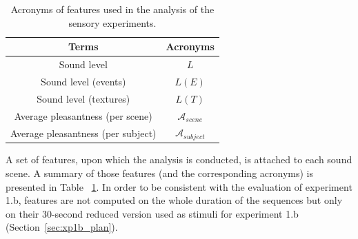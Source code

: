 \documentclass[12pt]{elsarticle}
\newcommand{\cf}{cf.}
\begin{document}
\begin{table}[t]
\centering
\begin{tabular}{c c}
Terms                              & Acronyms                   \\
\hline
Sound level                        & $L$                        \\
Sound level (events)               & $L(E)$                     \\
Sound level (textures)             & $L(T)$                     \\
Average pleasantness (per scene)   & $\mathcal{A}_{scene}$      \\
Average pleasantness (per subject) & $\mathcal{A}_{subject}$      \\
\hline
\end{tabular}
\vspace{0.5mm}
\caption{Acronyms of features used in the analysis of the sensory experiments.}
\label{tab:acronyme}
\end{table}


A set of features, upon which the analysis is conducted, is attached to each sound scene. A summary of those features (and the corresponding acronyms) is presented in Table ~\ref{tab:acronyme}. In order to be consistent with the evaluation of experiment 1.b, features are not computed on the whole duration of the sequences but only on their 30-second reduced version used as stimuli for experiment 1.b (Section~\ref{sec:xp1b_plan}).

\end{document}
